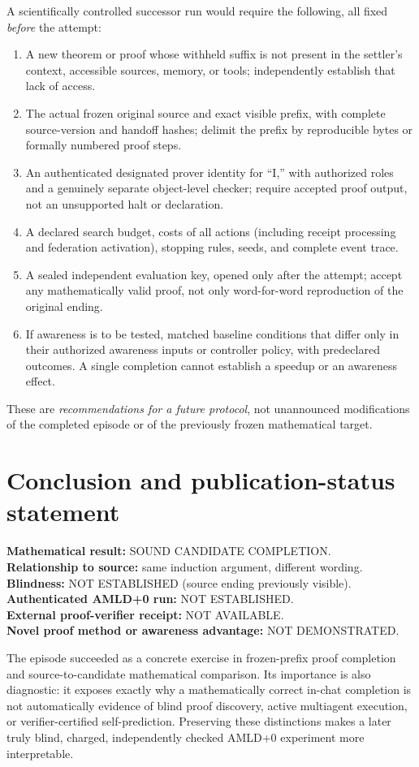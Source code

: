 \documentclass[11pt,letterpaper]{article}
\newcommand{\Status}[1]{\textsf{#1}}
\begin{document}
A scientifically controlled successor run would require the following, all fixed \emph{before} the attempt:
\begin{enumerate}
\item A new theorem or proof whose withheld suffix is not present in the settler's context, accessible sources, memory, or tools; independently establish that lack of access.
\item The actual frozen original source and exact visible prefix, with complete source-version and handoff hashes; delimit the prefix by reproducible bytes or formally numbered proof steps.
\item An authenticated designated prover identity for ``I,'' with authorized roles and a genuinely separate object-level checker; require accepted proof output, not an unsupported halt or declaration.
\item A declared search budget, costs of all actions (including receipt processing and federation activation), stopping rules, seeds, and complete event trace.
\item A sealed independent evaluation key, opened only after the attempt; accept any mathematically valid proof, not only word-for-word reproduction of the original ending.
\item If awareness is to be tested, matched baseline conditions that differ only in their authorized awareness inputs or controller policy, with predeclared outcomes. A single completion cannot establish a speedup or an awareness effect.
\end{enumerate}
These are \emph{recommendations for a future protocol}, not unannounced modifications of the completed episode or of the previously frozen mathematical target.

\section{Conclusion and publication-status statement}
\begin{resultbox}
\textbf{Mathematical result:} \Status{SOUND CANDIDATE COMPLETION}.\\
\textbf{Relationship to source:} same induction argument, different wording.\\
\textbf{Blindness:} \Status{NOT ESTABLISHED} (source ending previously visible).\\
\textbf{Authenticated AMLD+0 run:} \Status{NOT ESTABLISHED}.\\
\textbf{External proof-verifier receipt:} \Status{NOT AVAILABLE}.\\
\textbf{Novel proof method or awareness advantage:} \Status{NOT DEMONSTRATED}.
\end{resultbox}
The episode succeeded as a concrete exercise in frozen-prefix proof completion and source-to-candidate mathematical comparison. Its importance is also diagnostic: it exposes exactly why a mathematically correct in-chat completion is not automatically evidence of blind proof discovery, active multiagent execution, or verifier-certified self-prediction. Preserving these distinctions makes a later truly blind, charged, independently checked AMLD+0 experiment more interpretable.
\end{document}

